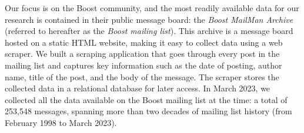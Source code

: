 





Our focus is on the Boost community, and the most readily available data for our research is contained in their public message board: the \textit{Boost MailMan Archive} (referred to hereafter as the \textit{Boost mailing list}). This archive is a message board hosted on a static HTML website, making it easy to collect data using a web scraper. We built a scraping application that goes through every post in the mailing list and captures key information such as the date of posting, author name, title of the post, and the body of the message. The scraper stores the collected data in a relational database for later access. In March 2023, we collected all the data available on the Boost mailing list at the time: a total of 253,548 messages, spanning more than two decades of mailing list history (from February 1998 to March 2023).

